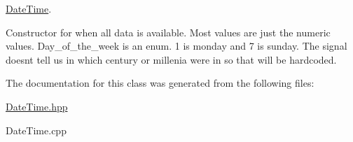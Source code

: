 \hyperlink{class_date_time}{Date\+Time}. 

Constructor for when all data is available. Most values are just the numeric values. Day\+\_\+of\+\_\+the\+\_\+week is an enum. 1 is monday and 7 is sunday. The signal doesn\textquotesingle{}t tell us in which century or millenia we\textquotesingle{}re in so that will be hardcoded. 

The documentation for this class was generated from the following files\+:\begin{DoxyCompactItemize}
\item 
\hyperlink{_date_time_8hpp}{Date\+Time.\+hpp}\item 
Date\+Time.\+cpp\end{DoxyCompactItemize}
